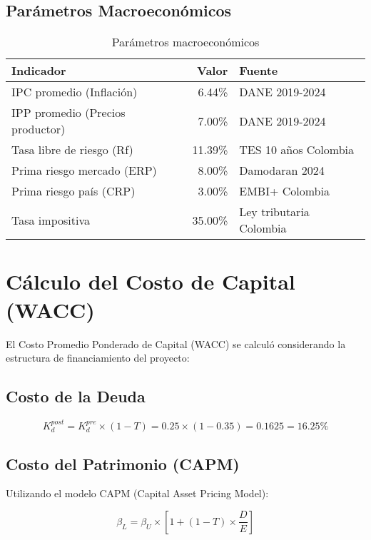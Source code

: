 \subsection{Parámetros Macroeconómicos}

\begin{table}[H]
\centering
\begin{tabular}{lrl}
\toprule
\textbf{Indicador} & \textbf{Valor} & \textbf{Fuente} \\
\midrule
IPC promedio (Inflación) & 6.44\% & DANE 2019-2024 \\
IPP promedio (Precios productor) & 7.00\% & DANE 2019-2024 \\
Tasa libre de riesgo (Rf) & 11.39\% & TES 10 años Colombia \\
Prima riesgo mercado (ERP) & 8.00\% & Damodaran 2024 \\
Prima riesgo país (CRP) & 3.00\% & EMBI+ Colombia \\
Tasa impositiva & 35.00\% & Ley tributaria Colombia \\
\bottomrule
\end{tabular}
\caption{Parámetros macroeconómicos}
\end{table}

\section{Cálculo del Costo de Capital (WACC)}

El Costo Promedio Ponderado de Capital (WACC) se calculó considerando la estructura de financiamiento del proyecto:

\subsection{Costo de la Deuda}

\begin{equation}
K_d^{post} = K_d^{pre} \times (1 - T) = 0.25 \times (1 - 0.35) = 0.1625 = 16.25\%
\end{equation}

\subsection{Costo del Patrimonio (CAPM)}

Utilizando el modelo CAPM (Capital Asset Pricing Model):

\begin{equation}
\beta_L = \beta_U \times \left[1 + (1-T) \times \frac{D}{E}\right]
\end{equation}

